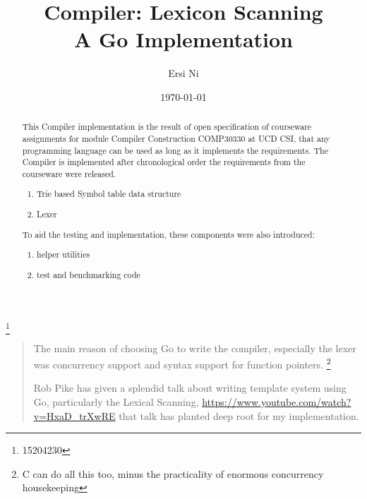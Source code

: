 \documentclass[%
 aip,
 jmp,%
 amsmath,amssymb,
 reprint,%
]{revtex4-1}
\begin{document}

\title[Lexicon Scanning for Compiler, a Computer Construction assignment report]{Compiler: Lexicon Scanning\\
A Go Implementation}%

\author{Ersi Ni}\thanks{15204230}


\date{\today}%

\begin{abstract}
This Compiler implementation is the result of open specification of courseware assignments for module Compiler Construction COMP30330 at UCD CSI, that any programming language can be used as long as it implements the requirements. The Compiler is implemented after chronological order the requirements from the courseware were released.
\begin{enumerate}[$\cdot$]
	\item Trie based Symbol table data structure
	\item Lexer
\end{enumerate}
To aid the testing and implementation, these components were also introduced:
\begin{enumerate}[$\cdot$]
	\item helper utilities
	\item test and benchmarking code
\end{enumerate}
\end{abstract}

\maketitle

\begin{quotation}
The main reason of choosing Go to write the compiler, especially the lexer was
concurrency support and syntax support for function pointers.   \footnote{C can do all
this too, minus the practicality of enormous concurrency housekeeping}

Rob Pike has given a splendid talk about writing template system using Go,
particularly the Lexical Scanning, \url{https://www.youtube.com/watch?v=HxaD_trXwRE}
that talk has planted deep root for my implementation.
\end{quotation}
\end{document}

